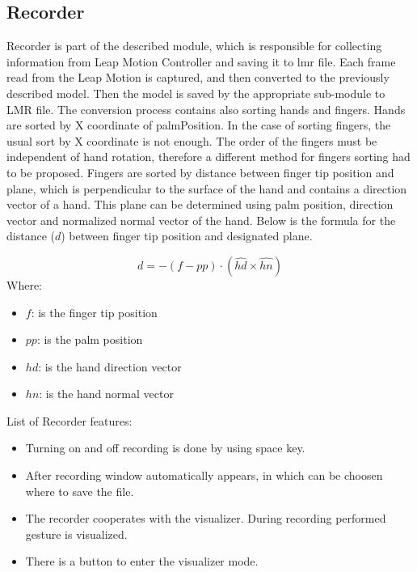 \subsection{Recorder}
Recorder is part of the described module, which is responsible for collecting information from Leap Motion Controller and saving it to lmr file.
Each frame read from the Leap Motion is captured, and then converted to the previously described model. Then the model is saved by the appropriate sub-module to LMR file. The conversion process contains also sorting hands and fingers. Hands are sorted by X coordinate of palmPosition. In the case of sorting fingers, the usual sort by X coordinate is not enough. The order of the fingers must be independent of hand rotation, therefore a different method for fingers sorting had to be proposed. Fingers are sorted by distance between finger tip position and plane, which is perpendicular to the surface of the hand and contains a direction vector of a hand. This plane can be determined using palm position, direction vector and normalized normal vector of the hand.
Below is the formula for the distance ($d$) between finger tip position and designated plane.

\[ d = -(f - pp) \cdot (\hat{hd} \times \hat{hn}) \]
Where:
\begin{itemize}
    \item[] $f$: is the finger tip position
    \item[] $pp$: is the palm position
    \item[] $hd$: is the hand direction vector
    \item[] $hn$: is the hand normal vector
\end{itemize}

List of Recorder features:
\begin{itemize}
\item Turning on and off recording is done by using space key.
\item After recording window automatically appears, in which can be choosen where to save the file.
\item The recorder cooperates with the visualizer. During recording performed gesture is visualized.
\item There is a button to enter the visualizer mode.
\end{itemize}

